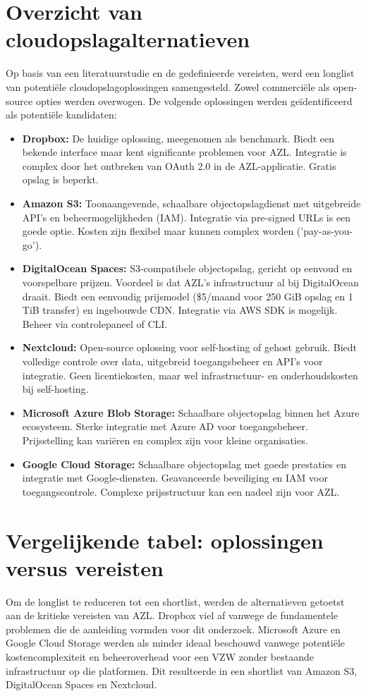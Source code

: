 \section{Overzicht van cloudopslagalternatieven}
\label{sec:overzicht_alternatieven}
Op basis van een literatuurstudie en de gedefinieerde vereisten, werd een longlist van potentiële cloudopslagoplossingen samengesteld. 
Zowel commerciële als open-source opties werden overwogen. De volgende oplossingen werden geïdentificeerd als potentiële kandidaten:
\begin{itemize}
    \item \textbf{Dropbox:} De huidige oplossing, meegenomen als benchmark. Biedt een bekende interface maar kent significante problemen voor AZL. Integratie is complex door het ontbreken van OAuth 2.0 in de AZL-applicatie. Gratis opslag is beperkt.
    \item \textbf{Amazon S3:} Toonaangevende, schaalbare objectopslagdienst met uitgebreide API's en beheermogelijkheden (IAM). Integratie via pre-signed URLs is een goede optie. Kosten zijn flexibel maar kunnen complex worden ('pay-as-you-go').
    \item \textbf{DigitalOcean Spaces:} S3-compatibele objectopslag, gericht op eenvoud en voorspelbare prijzen. Voordeel is dat AZL's infrastructuur al bij DigitalOcean draait. Biedt een eenvoudig prijsmodel (\$5/maand voor 250 GiB opslag en 1 TiB transfer) en ingebouwde CDN. Integratie via AWS SDK is mogelijk. Beheer via controlepaneel of CLI.
    \item \textbf{Nextcloud:} Open-source oplossing voor self-hosting of gehost gebruik. Biedt volledige controle over data, uitgebreid toegangsbeheer en API's voor integratie. Geen licentiekosten, maar wel infrastructuur- en onderhoudskosten bij self-hosting.
    \item \textbf{Microsoft Azure Blob Storage:} Schaalbare objectopslag binnen het Azure ecosysteem. Sterke integratie met Azure AD voor toegangsbeheer. Prijsstelling kan variëren en complex zijn voor kleine organisaties.
    \item \textbf{Google Cloud Storage:} Schaalbare objectopslag met goede prestaties en integratie met Google-diensten. Geavanceerde beveiliging en IAM voor toegangscontrole. Complexe prijsstructuur kan een nadeel zijn voor AZL.
\end{itemize}

\section{Vergelijkende tabel: oplossingen versus vereisten}
\label{sec:vergelijkingstabel}
Om de longlist te reduceren tot een shortlist, werden de alternatieven getoetst aan de kritieke vereisten van AZL. Dropbox viel af vanwege de fundamentele problemen die de aanleiding vormden voor dit onderzoek. Microsoft Azure en Google Cloud Storage werden als minder ideaal beschouwd vanwege potentiële kostencomplexiteit en beheeroverhead voor een VZW zonder bestaande infrastructuur op die platformen. Dit resulteerde in een shortlist van Amazon S3, DigitalOcean Spaces en Nextcloud.

